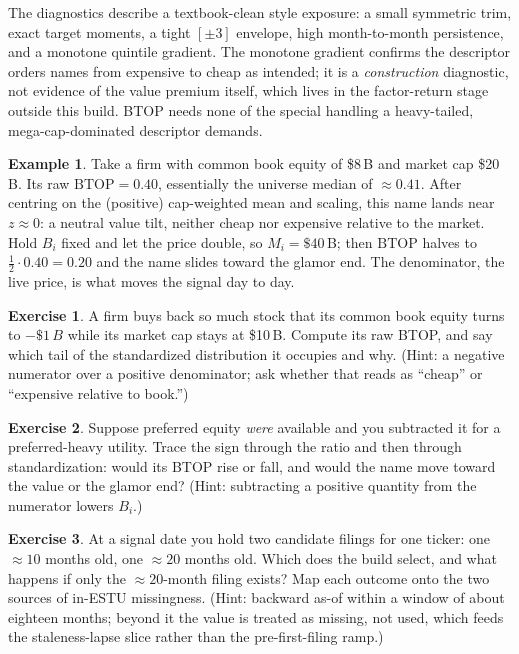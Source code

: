 \documentclass[11pt]{article}
\theoremstyle{definition}
\newtheorem{example}{Example}[section]
\newtheorem{exercise}{Exercise}[section]
\theoremstyle{plain}
\theoremstyle{remark}
\newcommand{\half}{\tfrac12}
\begin{document}
\begin{keyresult}
The diagnostics describe a textbook-clean style exposure: a small symmetric trim, exact target moments, a tight $[\pm 3]$ envelope, high month-to-month persistence, and a monotone quintile gradient. The monotone gradient confirms the descriptor orders names from expensive to cheap as intended; it is a \emph{construction} diagnostic, not evidence of the value premium itself, which lives in the factor-return stage outside this build. BTOP needs none of the special handling a heavy-tailed, mega-cap-dominated descriptor demands.
\end{keyresult}

\begin{example}
Take a firm with common book equity of \$8\,B and market cap \$20\,B. Its raw $\mathrm{BTOP} = 0.40$, essentially the universe median of $\approx 0.41$. After centring on the (positive) cap-weighted mean and scaling, this name lands near $z \approx 0$: a neutral value tilt, neither cheap nor expensive relative to the market. Hold $B_i$ fixed and let the price double, so $M_i = \$40$\,B; then $\mathrm{BTOP}$ halves to $\half\cdot 0.40 = 0.20$ and the name slides toward the glamor end. The denominator, the live price, is what moves the signal day to day.
\end{example}

\begin{exercise}
A firm buys back so much stock that its common book equity turns to $-\$1\,B$ while its market cap stays at \$10\,B. Compute its raw BTOP, and say which tail of the standardized distribution it occupies and why. (Hint: a negative numerator over a positive denominator; ask whether that reads as ``cheap'' or ``expensive relative to book.'')
\end{exercise}

\begin{exercise}
Suppose preferred equity \emph{were} available and you subtracted it for a preferred-heavy utility. Trace the sign through the ratio and then through standardization: would its BTOP rise or fall, and would the name move toward the value or the glamor end? (Hint: subtracting a positive quantity from the numerator lowers $B_i$.)
\end{exercise}

\begin{exercise}
At a signal date you hold two candidate filings for one ticker: one $\approx 10$ months old, one $\approx 20$ months old. Which does the build select, and what happens if only the $\approx 20$-month filing exists? Map each outcome onto the two sources of in-ESTU missingness. (Hint: backward as-of within a window of about eighteen months; beyond it the value is treated as missing, not used, which feeds the staleness-lapse slice rather than the pre-first-filing ramp.)
\end{exercise}
\end{document}
